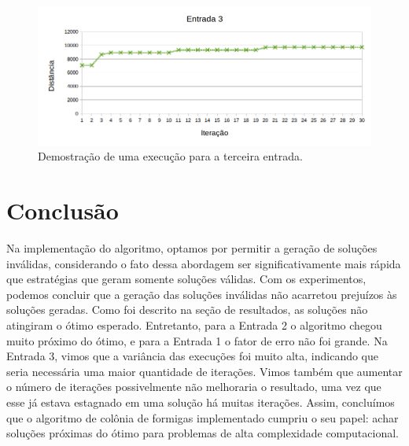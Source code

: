 \documentclass[a4paper, 12pt]{article}
\begin{document}
\begin{figure}[!htb]
\centering
\includegraphics[scale=0.60]{entrada3.png}
\caption{Demostração de uma execução para a terceira entrada.}
\label{fig:fig3}
\end{figure}

\section{Conclusão}
Na implementação do algoritmo, optamos por permitir a geração de soluções inválidas, considerando o fato dessa abordagem ser significativamente mais rápida que estratégias que geram somente soluções válidas. Com os experimentos, podemos concluir que a geração das soluções inválidas não acarretou prejuízos às soluções geradas. Como foi descrito na seção de resultados, as soluções não atingiram o ótimo esperado. Entretanto, para a Entrada 2 o algoritmo chegou muito próximo do ótimo, e para a Entrada 1 o fator de erro não foi grande.
Na Entrada 3, vimos que a variância das execuções foi muito alta, indicando que seria necessária uma maior quantidade de iterações. Vimos também que aumentar o número de iterações possivelmente não melhoraria o resultado, uma vez que esse já estava estagnado em uma solução há muitas iterações. Assim, concluímos que o algoritmo de colônia de formigas implementado cumpriu o seu papel: achar soluções próximas do ótimo para problemas de alta complexidade computacional.
\end{document}
